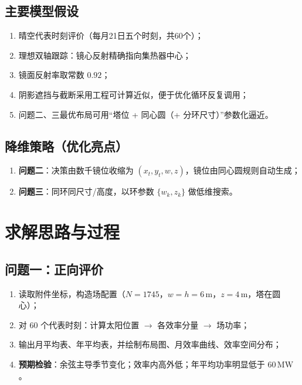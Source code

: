 \documentclass[12pt,a4paper]{ctexart}
\begin{document}
\subsection{主要模型假设}
\begin{enumerate}
  \item 晴空代表时刻评价（每月21日五个时刻，共60个）；
  \item 理想双轴跟踪：镜心反射精确指向集热器中心；
  \item 镜面反射率取常数 $0.92$；
  \item 阴影遮挡与截断采用工程可计算近似，便于优化循环反复调用；
  \item 问题二、三最优布局可用“塔位 + 同心圆（+ 分环尺寸）”参数化逼近。
\end{enumerate}

\subsection{降维策略（优化亮点）}
\begin{enumerate}
  \item \textbf{问题二}：决策由数千镜位收缩为 $(x_t,y_t,w,z)$，镜位由同心圆规则自动生成；
  \item \textbf{问题三}：同环同尺寸/高度，以环参数 $\{w_k,z_k\}$ 做低维搜索。
\end{enumerate}

\section{求解思路与过程}
\subsection{问题一：正向评价}
\begin{enumerate}
  \item 读取附件坐标，构造场配置（$N=1745$，$w=h=6\,\mathrm{m}$，$z=4\,\mathrm{m}$，塔在圆心）；
  \item 对 $60$ 个代表时刻：计算太阳位置 $\rightarrow$ 各效率分量 $\rightarrow$ 场功率；
  \item 输出月平均表、年平均表，并绘制布局图、月效率曲线、效率空间分布；
  \item \textbf{预期检验}：余弦主导季节变化；效率内高外低；年平均功率明显低于 $60\,\mathrm{MW}$。
\end{enumerate}
\end{document}
